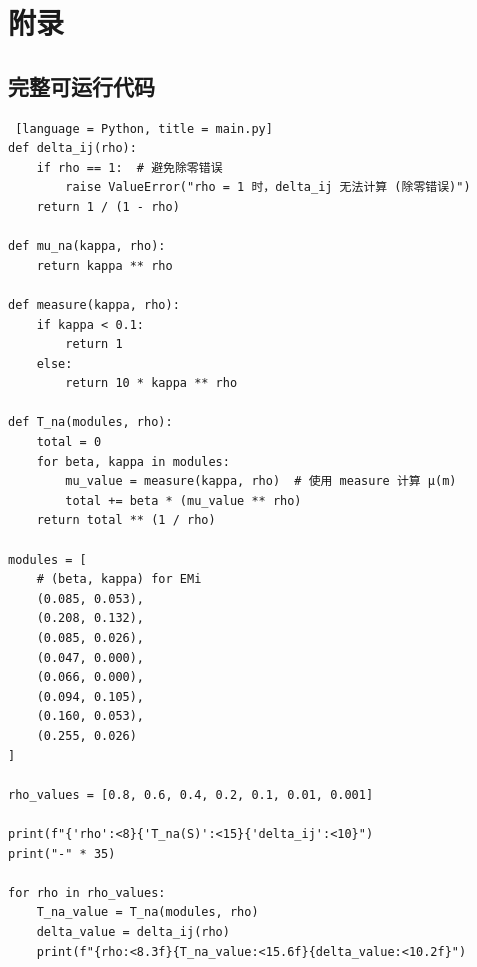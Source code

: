 \documentclass[14pt,a4paper,UTF8,twoside]{article}
\begin{document}
\section{附录}

\subsection{完整可运行代码}

\begin{lstlisting} [language = Python, title = main.py]
def delta_ij(rho):
    if rho == 1:  # 避免除零错误
        raise ValueError("rho = 1 时，delta_ij 无法计算 (除零错误)")
    return 1 / (1 - rho)

def mu_na(kappa, rho):
    return kappa ** rho

def measure(kappa, rho):
    if kappa < 0.1:
        return 1
    else:
        return 10 * kappa ** rho

def T_na(modules, rho):
    total = 0
    for beta, kappa in modules:
        mu_value = measure(kappa, rho)  # 使用 measure 计算 μ(m)
        total += beta * (mu_value ** rho)
    return total ** (1 / rho)

modules = [
    # (beta, kappa) for EMi
    (0.085, 0.053),
    (0.208, 0.132),
    (0.085, 0.026),
    (0.047, 0.000),
    (0.066, 0.000),
    (0.094, 0.105),
    (0.160, 0.053),
    (0.255, 0.026)
]

rho_values = [0.8, 0.6, 0.4, 0.2, 0.1, 0.01, 0.001]

print(f"{'rho':<8}{'T_na(S)':<15}{'delta_ij':<10}")
print("-" * 35)

for rho in rho_values:
    T_na_value = T_na(modules, rho)
    delta_value = delta_ij(rho)
    print(f"{rho:<8.3f}{T_na_value:<15.6f}{delta_value:<10.2f}")
\end{lstlisting}
\end{document}
